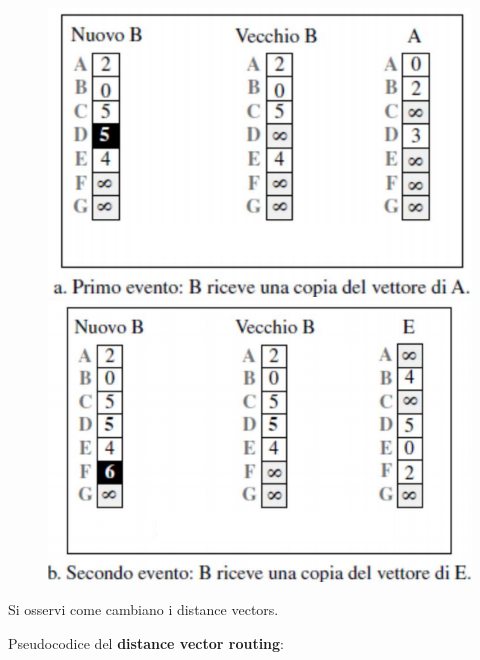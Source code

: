 \documentclass[11pt,a4paper,oneside]{book}
\theoremstyle{definition}
\begin{document}
\begin{figure}[!h]
	\centering
	\includegraphics[scale=0.32]{Immagini/DV_es1.png}
	\includegraphics[scale=0.32]{Immagini/DV_es2.png}
\end{figure}

Si osservi come cambiano i distance vectors.

\pagebreak

Pseudocodice del \textbf{distance vector routing}:
\end{document}
